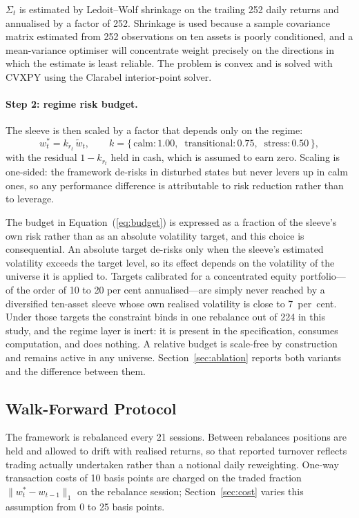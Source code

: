 $\Sigma_t$ is estimated by Ledoit--Wolf shrinkage \citep{ledoit04} on the trailing 252
daily returns and annualised by a factor of 252. Shrinkage is used because a sample
covariance matrix estimated from 252 observations on ten assets is poorly conditioned,
and a mean-variance optimiser will concentrate weight precisely on the directions in
which the estimate is least reliable. The problem is convex and is solved with CVXPY
using the Clarabel interior-point solver.

\paragraph{Step 2: regime risk budget.} The sleeve is then scaled by a factor that
depends only on the regime:
\begin{equation}
w^{\ast}_t = k_{r_t} \, \tilde{w}_t, \qquad
k = \{\,\text{calm}: 1.00, \;\; \text{transitional}: 0.75, \;\; \text{stress}: 0.50\,\},
\label{eq:budget}
\end{equation}
with the residual $1 - k_{r_t}$ held in cash, which is assumed to earn zero. Scaling is
one-sided: the framework de-risks in disturbed states but never levers up in calm ones,
so any performance difference is attributable to risk reduction rather than to leverage.

The budget in Equation~(\ref{eq:budget}) is expressed as a fraction of the sleeve's own
risk rather than as an absolute volatility target, and this choice is consequential.
An absolute target de-risks only when the sleeve's estimated volatility exceeds the
target level, so its effect depends on the volatility of the universe it is applied to.
Targets calibrated for a concentrated equity portfolio---of the order of 10 to 20 per
cent annualised---are simply never reached by a diversified ten-asset sleeve whose own
realised volatility is close to 7~per~cent. Under those targets the constraint binds in
one rebalance out of 224 in this study, and the regime layer is inert: it is present in
the specification, consumes computation, and does nothing. A relative budget is
scale-free by construction and remains active in any universe.
Section~\ref{sec:ablation} reports both variants and the difference between them.

\subsection{Walk-Forward Protocol}

The framework is rebalanced every 21 sessions. Between rebalances positions are held
and allowed to drift with realised returns, so that reported turnover reflects trading
actually undertaken rather than a notional daily reweighting. One-way transaction costs
of 10 basis points are charged on the traded fraction $\|w^{\ast}_t - w_{t-1}\|_1$ on
the rebalance session; Section~\ref{sec:cost} varies this assumption from 0 to 25 basis
points.

